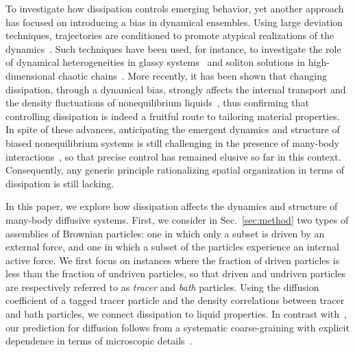 \documentclass[superscriptaddress, twocolumn, prx, longbibliography, nofootinbib]{revtex4-1}
\begin{document}
To investigate how dissipation controls emerging behavior, yet another approach has focused on introducing a bias in dynamical ensembles. Using large deviation techniques, trajectories are conditioned to promote atypical realizations of the dynamics~\cite{Touchette2009, Jack2010}. Such techniques have been used, for instance, to investigate the role of dynamical heterogeneities in glassy systems~\cite{garrahan2007, Hedges2009, Pitard2011, Speck2012, Bodineau2012a, Limmer2014, Nemoto2017} and soliton solutions in high-dimensional chaotic chains~\cite{tailleur2007probing, laffargue2013}. More recently, it has been shown that changing dissipation, through a dynamical bias, strongly affects the internal transport and the density fluctuations of nonequilibrium liquids~\cite{Cagnetta2017, Nemoto2019}, thus confirming that controlling dissipation is indeed a fruitful route to tailoring material properties. In spite of these advances, anticipating the emergent dynamics and structure of biased nonequilibrium systems is still challenging in the presence of many-body interactions~\cite{Chetrite2013, Jack2010}, so that precise control has remained elusive so far in this context. Consequently, any generic principle rationalizing spatial organization in terms of dissipation is still lacking.


In this paper, we explore how dissipation affects the dynamics and structure of many-body diffusive systems. First, we consider in Sec.~\ref{sec:method} two types of assemblies of Brownian particles: one in which only a subset is driven by an external force, and one in which a subset of the particles experience an internal active force. We first focus on instances where the fraction of driven particles is less than the fraction of undriven particles, so that driven and undriven particles are respectively referred to as {\it tracer} and {\it bath} particles. Using the diffusion coefficient of a tagged tracer particle and the density correlations between tracer and bath particles, we connect dissipation to liquid properties. In contrast with~\cite{delJunco2018}, our prediction for diffusion follows from a systematic coarse-graining with explicit dependence in terms of microscopic details~\cite{Dean1996, Demery2011, Demery2014}.
\end{document}
